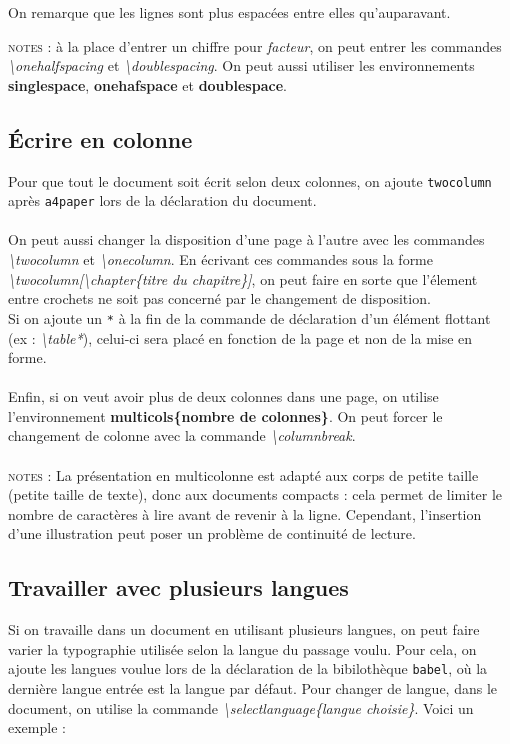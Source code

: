 \documentclass[a4paper, 10pt]{book}
\begin{document}
On remarque que les lignes sont plus espacées entre elles qu'auparavant.

\textsc{notes :} à la place d'entrer un chiffre pour \textit{facteur}, on peut entrer les commandes \textit{\textbackslash onehalfspacing} et \textit{\textbackslash doublespacing}. On peut aussi utiliser les environnements \textbf{singlespace}, \textbf{onehafspace} et \textbf{doublespace}.
\\
\subsection{\'Ecrire en colonne\\}

Pour que tout le document soit écrit selon deux colonnes, on ajoute \texttt{twocolumn} après \texttt{a4paper} lors de la déclaration du document. \\ \\
On peut aussi changer la disposition d'une page à l'autre avec les commandes \textit{\textbackslash twocolumn} et \textit{\textbackslash onecolumn}. En écrivant ces commandes sous la forme \textit{\textbackslash twocolumn[\textbackslash chapter\{titre du chapitre\}]}, on peut faire en sorte que l'élement entre crochets ne soit pas concerné par le changement de disposition.\\
Si on ajoute un \texttt{*} à la fin de la commande de déclaration d'un élément flottant (ex : \textit{\textbackslash table*}), celui-ci sera placé en fonction de la page et non de la mise en forme.\\ \\
Enfin, si on veut avoir plus de deux colonnes dans une page, on utilise l'environnement \textbf{multicols\{nombre de colonnes\}}. On peut forcer le changement de colonne avec la commande \textit{\textbackslash columnbreak}.\\ \\
\textsc{notes :} La présentation en multicolonne est adapté aux corps de petite taille (petite taille de texte), donc aux documents compacts : cela permet de limiter le nombre de caractères à lire avant de revenir à la ligne. Cependant, l'insertion d'une illustration peut poser un problème de continuité de lecture.
\\
\subsection{Travailler avec plusieurs langues\\}
Si on travaille dans un document en utilisant plusieurs langues, on peut faire varier la typographie utilisée selon la langue du passage voulu. Pour cela, on ajoute les langues voulue lors de la déclaration de la bibilothèque \texttt{babel}, où la dernière langue entrée est la langue par défaut. Pour changer de langue, dans le document, on utilise la commande \textit{\textbackslash selectlanguage\{langue choisie\}}. Voici un exemple : \\ \\
\end{document}

